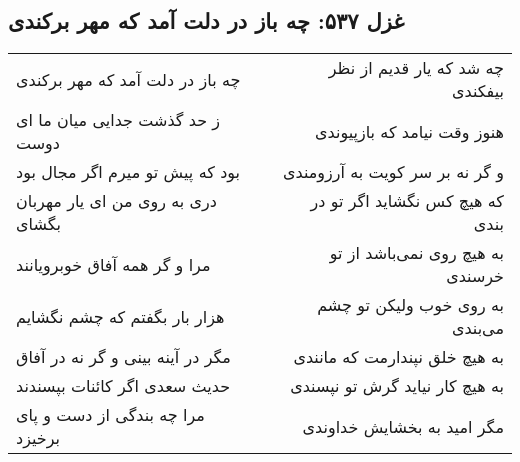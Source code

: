 \begin{center}
\section*{غزل ۵۳۷: چه باز در دلت آمد که مهر برکندی}
\label{sec:537}
\begin{longtable}{l p{0.5cm} r}
چه باز در دلت آمد که مهر برکندی
&&
چه شد که یار قدیم از نظر بیفکندی
\\
ز حد گذشت جدایی میان ما ای دوست
&&
هنوز وقت نیامد که بازپیوندی
\\
بود که پیش تو میرم اگر مجال بود
&&
و گر نه بر سر کویت به آرزومندی
\\
دری به روی من ای یار مهربان بگشای
&&
که هیچ کس نگشاید اگر تو در بندی
\\
مرا و گر همه آفاق خوبرویانند
&&
به هیچ روی نمی‌باشد از تو خرسندی
\\
هزار بار بگفتم که چشم نگشایم
&&
به روی خوب ولیکن تو چشم می‌بندی
\\
مگر در آینه بینی و گر نه در آفاق
&&
به هیچ خلق نپندارمت که مانندی
\\
حدیث سعدی اگر کائنات بپسندند
&&
به هیچ کار نیاید گرش تو نپسندی
\\
مرا چه بندگی از دست و پای برخیزد
&&
مگر امید به بخشایش خداوندی
\\
\end{longtable}
\end{center}
